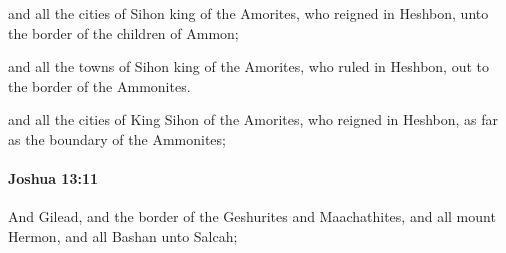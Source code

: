 			\begin{versebox}
					\item[BHS] 
					\item[ASV] and all the cities of Sihon king of the Amorites, who reigned in Heshbon, unto the border of the children of Ammon;
					\item[NIV] and all the towns of Sihon king of the Amorites, who ruled in Heshbon, out to the border of the Ammonites.
					\item[NRSV] and all the cities of King Sihon of the Amorites, who reigned in Heshbon, as far as the boundary of the Ammonites;
			\end{versebox}

		\paragraph{Joshua 13:11} %
			\label{JOSHUA-13-11}

			And Gilead, and the border of the Geshurites and Maachathites, and all mount Hermon, and all Bashan unto Salcah;

